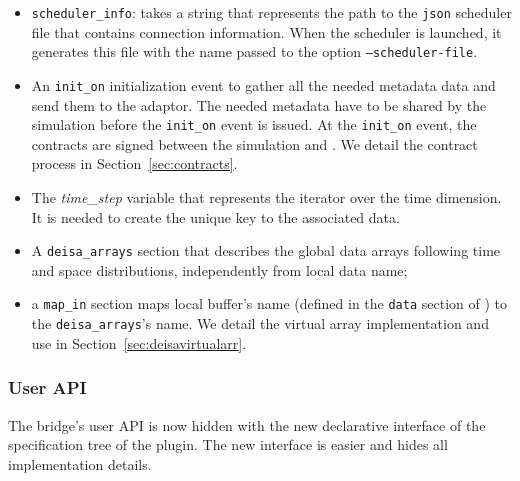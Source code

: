 \begin{itemize}
    \item \texttt{scheduler\_info}: takes a string that represents the path to the \texttt{json} scheduler file that contains connection information. When the scheduler is launched, it generates this file with the name passed to the option \texttt{--scheduler-file}. 

    \item An \texttt{init\_on} initialization event to gather all the needed metadata data and send them to the \deisa adaptor. The needed metadata have to be shared by the simulation before the \texttt{init\_on} event is issued. At the \texttt{init\_on} event, the contracts are signed between the simulation and \dask. We detail the contract process in Section~\ref{sec:contracts}.
    
    \item The \textit{time\_step} variable that represents the iterator over the time dimension. It is needed to create the unique key to the associated data.  
    
    \item A \texttt{deisa\_arrays} section that describes the global data arrays following time and space distributions, independently from local data name; 
    
    \item a \texttt{map\_in} section maps local buffer's name (defined in the \texttt{data} section of \pdi) to the \texttt{deisa\_arrays}'s name. We detail the \deisa virtual array implementation and use in Section~\ref{sec:deisavirtualarr}. 
\end{itemize}


\subsubsection{User API}

The bridge's user API is now hidden with the new declarative interface of the specification tree of the \deisa plugin. The new interface is easier and hides all implementation details.

